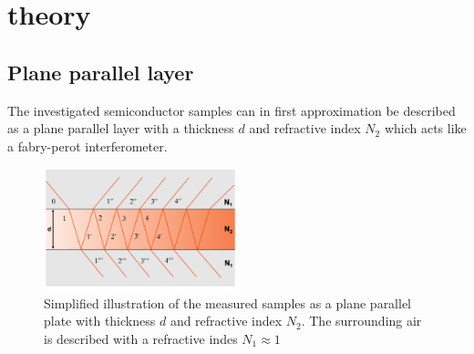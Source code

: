 \nopagebreak
\section{theory}
\subsection{Plane parallel layer}
The investigated semiconductor samples can in first approximation be described as a plane parallel 
layer with a thickness $d$ and refractive index $N_2$ which acts like a fabry-perot interferometer.
\begin{figure}[h]
    \centering
    \includegraphics[width=0.5\textwidth]{Fabry-Perot.png}
    \caption{Simplified illustration of the measured samples as a plane parallel plate
    with thickness $d$ and refractive index $N_2$. The surrounding air is described with a 
    refractive indes $N_1\approx1$ \cite{Gerthsen}}
    \label{fig:layer}
\end{figure}
